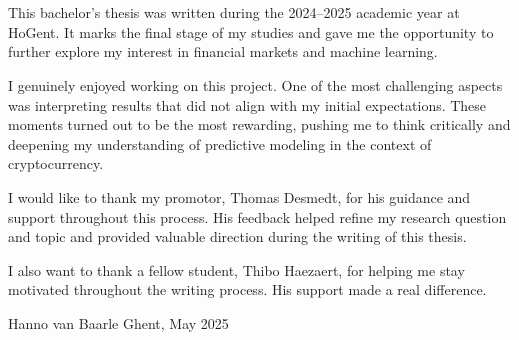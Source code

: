 
\chapter*{}%
\label{ch:voorwoord}

This bachelor’s thesis was written during the 2024–2025 academic year at HoGent. It marks the final stage of my studies and gave me the opportunity to further explore my interest in financial markets and machine learning.

I genuinely enjoyed working on this project. One of the most challenging aspects was interpreting results that did not align with my initial expectations. These moments turned out to be the most rewarding, pushing me to think critically and deepening my understanding of predictive modeling in the context of cryptocurrency.

I would like to thank my promotor, Thomas Desmedt, for his guidance and support throughout this process. His feedback helped refine my research question and topic and provided valuable direction during the writing of this thesis.

I also want to thank a fellow student, Thibo Haezaert, for helping me stay motivated throughout the writing process. His support made a real difference.

Hanno van Baarle
Ghent, May 2025